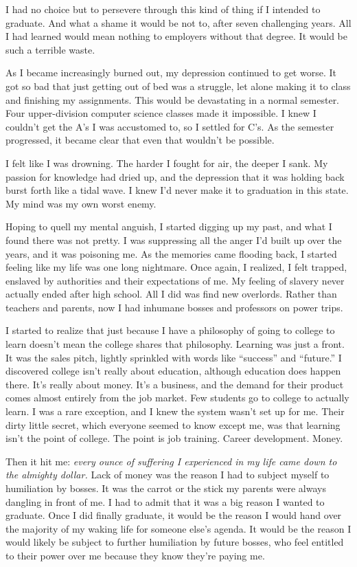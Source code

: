 I had no choice but to persevere through this kind of thing if I intended to graduate. And what a shame it would be not to, after seven challenging years. All I had learned would mean nothing to employers without that degree. It would be such a terrible waste.

As I became increasingly burned out, my depression continued to get worse. It got so bad that just getting out of bed was a struggle, let alone making it to class and finishing my assignments. This would be devastating in a normal semester. Four upper-division computer science classes made it impossible. I knew I couldn't get the A's I was accustomed to, so I settled for C's. As the semester progressed, it became clear that even that wouldn't be possible.

I felt like I was drowning. The harder I fought for air, the deeper I sank. My passion for knowledge had dried up, and the depression that it was holding back burst forth like a tidal wave. I knew I'd never make it to graduation in this state. My mind was my own worst enemy.

Hoping to quell my mental anguish, I started digging up my past, and what I found there was not pretty. I was suppressing all the anger I'd built up over the years, and it was poisoning me. As the memories came flooding back, I started feeling like my life was one long nightmare. Once again, I realized, I felt trapped, enslaved by authorities and their expectations of me. My feeling of slavery never actually ended after high school. All I did was find new overlords. Rather than teachers and parents, now I had inhumane bosses and professors on power trips.

I started to realize that just because I have a philosophy of going to college to learn doesn't mean the college shares that philosophy. Learning was just a front. It was the sales pitch, lightly sprinkled with words like ``success'' and ``future.'' I discovered college isn't really about education, although education does happen there. It's really about money. It's a business, and the demand for their product comes almost entirely from the job market. Few students go to college to actually learn. I was a rare exception, and I knew the system wasn't set up for me. Their dirty little secret, which everyone seemed to know except me, was that learning isn't the point of college. The point is job training. Career development. Money.

Then it hit me: \emph{every ounce of suffering I experienced in my life came down to the almighty dollar.} Lack of money was the reason I had to subject myself to humiliation by bosses. It was the carrot or the stick my parents were always dangling in front of me. I had to admit that it was a big reason I wanted to graduate. Once I did finally graduate, it would be the reason I would hand over the majority of my waking life for someone else's agenda. It would be the reason I would likely be subject to further humiliation by future bosses, who feel entitled to their power over me because they know they're paying me.

